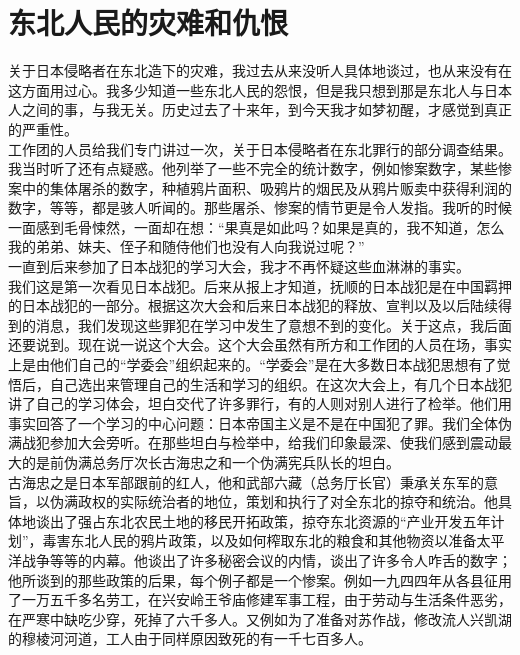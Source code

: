 \fancyhead[RO]{} %
\fancyhead[LE]{} %
\chapter*{东北人民的灾难和仇恨}
\thispagestyle{empty}
关于日本侵略者在东北造下的灾难，我过去从来没听人具体地谈过，也从来没有在这方面用过心。我多少知道一些东北人民的怨恨，但是我只想到那是东北人与日本人之间的事，与我无关。历史过去了十来年，到今天我才如梦初醒，才感觉到真正的严重性。\\

工作团的人员给我们专门讲过一次，关于日本侵略者在东北罪行的部分调查结果。我当时听了还有点疑惑。他列举了一些不完全的统计数字，例如惨案数字，某些惨案中的集体屠杀的数字，种植鸦片面积、吸鸦片的烟民及从鸦片贩卖中获得利润的数字，等等，都是骇人听闻的。那些屠杀、惨案的情节更是令人发指。我听的时候一面感到毛骨悚然，一面却在想：“果真是如此吗？如果是真的，我不知道，怎么我的弟弟、妹夫、侄子和随侍他们也没有人向我说过呢？”\\

一直到后来参加了日本战犯的学习大会，我才不再怀疑这些血淋淋的事实。\\

我们这是第一次看见日本战犯。后来从报上才知道，抚顺的日本战犯是在中国羁押的日本战犯的一部分。根据这次大会和后来日本战犯的释放、宣判以及以后陆续得到的消息，我们发现这些罪犯在学习中发生了意想不到的变化。关于这点，我后面还要说到。现在说一说这个大会。这个大会虽然有所方和工作团的人员在场，事实上是由他们自己的“学委会”组织起来的。“学委会”是在大多数日本战犯思想有了觉悟后，自己选出来管理自己的生活和学习的组织。在这次大会上，有几个日本战犯讲了自己的学习体会，坦白交代了许多罪行，有的人则对别人进行了检举。他们用事实回答了一个学习的中心问题：日本帝国主义是不是在中国犯了罪。我们全体伪满战犯参加大会旁听。在那些坦白与检举中，给我们印象最深、使我们感到震动最大的是前伪满总务厅次长古海忠之和一个伪满宪兵队长的坦白。\\

古海忠之是日本军部跟前的红人，他和武部六藏（总务厅长官）秉承关东军的意旨，以伪满政权的实际统治者的地位，策划和执行了对全东北的掠夺和统治。他具体地谈出了强占东北农民土地的移民开拓政策，掠夺东北资源的“产业开发五年计划”，毒害东北人民的鸦片政策，以及如何榨取东北的粮食和其他物资以准备太平洋战争等等的内幕。他谈出了许多秘密会议的内情，谈出了许多令人咋舌的数字；他所谈到的那些政策的后果，每个例子都是一个惨案。例如一九四四年从各县征用了一万五千多名劳工，在兴安岭王爷庙修建军事工程，由于劳动与生活条件恶劣，在严寒中缺吃少穿，死掉了六千多人。又例如为了准备对苏作战，修改流人兴凯湖的穆棱河河道，工人由于同样原因致死的有一千七百多人。\\

